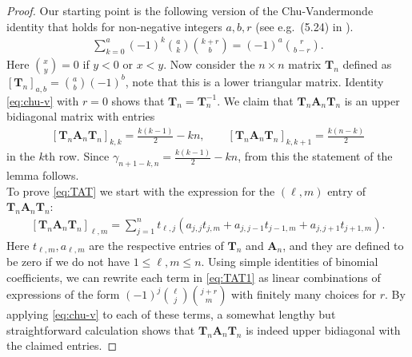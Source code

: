 \documentclass[12pt]{article}
\theoremstyle{definition} %
\theoremstyle{remark} %
\begin{document}
\begin{proof}
 Our starting point is the following version of the Chu-Vandermonde identity that holds for non-negative integers $a, b, r$ (see e.g.~(5.24) in \cite{Concrete}
).
 \begin{align}\label{eq:chu-v}
     \sum_{k=0}^a (-1)^k \binom{a}{k}\binom{k+r}{b}=(-1)^a \binom{r}{b-r}.
 \end{align}
Here $\binom{x}{y}=0$ if $y<0$ or $x<y$. Now consider the $n\times n$ matrix $\mathbf{T}_n$ defined as $[\mathbf{T}_n]_{a,b}=\binom{a}{b}(-1)^b$, note that this is a lower triangular matrix. Identity \eqref{eq:chu-v} with $r=0$ shows that $\mathbf{T}_n=\mathbf{T}_n^{-1}$. We claim that $\mathbf{T}_n \mathbf{A}_n \mathbf{T}_n$ is an upper bidiagonal matrix with entries
\begin{align}\label{eq:TAT}
 [\mathbf{T}_n \mathbf{A}_n \mathbf{T}_n]_{k,k}= \frac{k(k-1)}{2}-k n, \qquad [\mathbf{T}_n \mathbf{A}_n \mathbf{T}_n]_{k,k+1}=\frac{k(n-k)}{2}
\end{align}
 in the $k$th row. Since  $  \gamma_{n+1-k,n}=\frac{k(k-1)}{2}-k n$, from this the statement of the lemma follows.\\
To prove \eqref{eq:TAT} we start with the expression for the  $(\ell,m)$ entry of $\mathbf{T}_n\mathbf{A}_n\mathbf{T}_n$:
\begin{align}\label{eq:TAT1}
    [\mathbf{T}_n\mathbf{A}_n\mathbf{T}_n]_{\ell,m}=\sum_{j=1}^n t_{\ell,j} (a_{j,j} t_{j,m}+a_{j,j-1}t_{j-1,m}+a_{j,j+1}t_{j+1,m}). 
\end{align}
Here $t_{\ell,m}, a_{\ell,m}$ are the respective entries of $\mathbf{T}_n$ and $\mathbf{A}_n$, and they are defined to be zero if we do not have $1\le \ell, m\le n$. 
Using simple identities of binomial coefficients, we can rewrite each term in \eqref{eq:TAT1} as linear combinations of expressions of the form
$(-1)^j\binom{\ell}{j} \binom{j+r}{m}$ with finitely many choices for $r$. By applying  \eqref{eq:chu-v} to each of these terms, a somewhat lengthy but straightforward calculation shows that $\mathbf{T}_n\mathbf{A}_n\mathbf{T}_n$ is indeed upper bidiagonal with the claimed entries. 
\end{proof}
\end{document}

